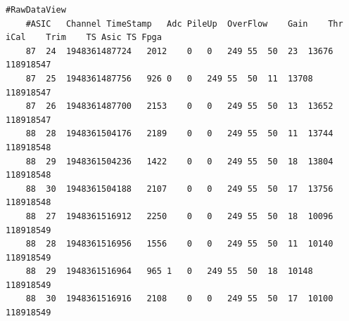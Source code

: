 \documentclass[a4paper, 12pt, twoside, openright]{article}
\begin{document}
	\begin{minipage}{\linewidth}
	\begin{lstlisting}[style=CStyle,caption={Zawartość pliku *more.txt}]
	#RawDataView
	#ASIC	Channel	TimeStamp	Adc	PileUp	OverFlow	Gain	Thr	iCal	Trim	TS Asic	TS Fpga
	87	24	1948361487724	2012	0	0	249	55	50	23	13676	118918547
	87	25	1948361487756	926	0	0	249	55	50	11	13708	118918547
	87	26	1948361487700	2153	0	0	249	55	50	13	13652	118918547
	88	28	1948361504176	2189	0	0	249	55	50	11	13744	118918548
	88	29	1948361504236	1422	0	0	249	55	50	18	13804	118918548
	88	30	1948361504188	2107	0	0	249	55	50	17	13756	118918548
	88	27	1948361516912	2250	0	0	249	55	50	18	10096	118918549
	88	28	1948361516956	1556	0	0	249	55	50	11	10140	118918549
	88	29	1948361516964	965	1	0	249	55	50	18	10148	118918549
	88	30	1948361516916	2108	0	0	249	55	50	17	10100	118918549
	\end{lstlisting}
	\end{minipage}

	\begin{table}[H]

		\caption{Pierwsze 10 rekordów pliku .txt}
		\label{tab:data}

	\end{table}
\end{document}
